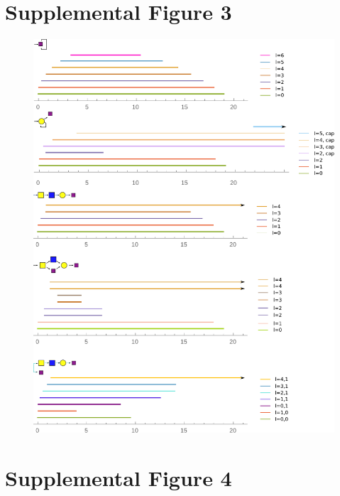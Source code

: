 \documentclass{article}
\begin{document}
\section*{Supplemental Figure 3}
\begin{figure}
\includegraphics[width=\textwidth]{SuppFig_3.pdf}
\end{figure}
\section*{Supplemental Figure 4}
\end{document}
